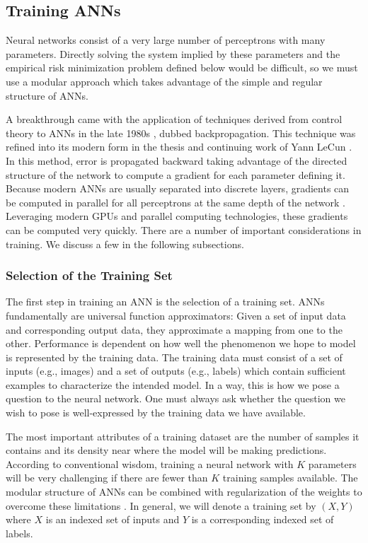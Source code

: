 \subsection{Training ANNs}

Neural networks consist of a very large number of perceptrons with many parameters. Directly solving the system implied by these parameters and the empirical risk minimization problem defined below would be difficult, so we must use a
modular approach which takes advantage of the simple and regular structure of ANNs.

 A breakthrough came with the application of techniques derived from control theory to ANNs in the late 1980s \cite{rumelhart1986learning}, dubbed backpropagation. This technique was refined into its modern form in the thesis and continuing work of Yann LeCun \cite{lecun1988theoretical}. In this method, error is propagated backward taking advantage of the directed structure of the network to compute a gradient for each parameter defining it. Because modern ANNs are usually separated into discrete layers, gradients can be computed in parallel for all perceptrons at the same depth of the network
\cite{Bishop:2006:PRM:1162264}. Leveraging modern GPUs and parallel computing technologies, these gradients can be computed very quickly. There are a number of important considerations in training. We discuss a few in the following subsections. 

\subsubsection{Selection of the Training Set}

The first step in training an ANN is the selection of a training set. ANNs fundamentally are universal function approximators: Given a set of input data and corresponding output data, they approximate a mapping from one to the other. Performance is dependent on how well the phenomenon we hope to model is represented by the training data. The training data must consist of a set of inputs (e.g., images) and a set of outputs (e.g., labels) which contain sufficient examples to characterize the intended model. In a way, this is how we pose a question to the neural network. One must always ask whether the question we wish to pose is well-expressed by the training data we have available. 

The most important attributes of a training dataset are the number of
samples it contains and its density near where the model will be making predictions. According to conventional wisdom, training a neural network with $K$ parameters
will be very challenging if there are fewer than $K$ training samples
available. The modular structure of ANNs can be combined with regularization of the weights to overcome these limitations \cite{liu2015very}. 
In general, we will denote a training set by $(X,Y)$ where $X$ is an indexed set of inputs and $Y$ is a corresponding indexed set of labels. 

